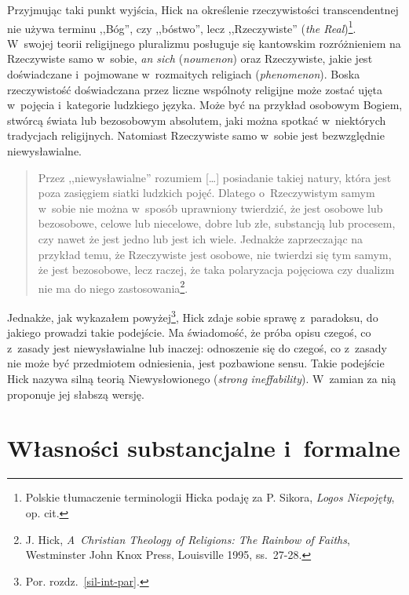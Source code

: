 Przyjmując taki punkt wyjścia, Hick na określenie rzeczywistości transcendentnej nie używa terminu ,,Bóg'', czy ,,bóstwo'', lecz ,,Rzeczywiste'' (\textit{the Real})\footnote{Polskie tłumaczenie terminologii Hicka podaję za P. Sikora, \textit{Logos Niepojęty}, op. cit.}. W~swojej teorii religijnego pluralizmu posługuje się kantowskim rozróżnieniem na Rzeczywiste samo w~sobie, \textit{an sich} (\textit{noumenon}) oraz Rzeczywiste, jakie jest doświadczane i~pojmowane w~rozmaitych religiach (\textit{phenomenon}). Boska rzeczywistość doświadczana przez liczne wspólnoty religijne może zostać ujęta w~pojęcia i~kategorie ludzkiego języka. Może być na przykład osobowym Bogiem, stwórcą świata lub bezosobowym absolutem, jaki można spotkać w~niektórych tradycjach religijnych. Natomiast Rzeczywiste samo w~sobie jest bezwzględnie niewysławialne.

\begin{quote}
Przez ,,niewysławialne'' rozumiem [\ldots] posiadanie takiej natury, która jest poza zasięgiem siatki ludzkich pojęć. Dlatego o~Rzeczywistym samym w~sobie nie można w~sposób uprawniony twierdzić, że jest osobowe lub bezosobowe, celowe lub niecelowe, dobre lub złe, substancją lub procesem, czy nawet że jest jedno lub jest ich wiele. Jednakże zaprzeczając na przykład temu, że Rzeczywiste jest osobowe, nie twierdzi się tym samym, że jest bezosobowe, lecz raczej, że taka polaryzacja pojęciowa czy dualizm nie ma do niego zastosowania\footnote{J. Hick, \textit{A~Christian Theology of Religions: The Rainbow of Faiths}, Westminster John Knox Press, Louisville 1995, ss.~27-28.}.
\end{quote}

Jednakże, jak wykazałem powyżej\footnote{Por. rozdz.~\ref{sil-int-par}.}, Hick zdaje sobie sprawę z~paradoksu, do jakiego prowadzi takie podejście. Ma świadomość, że próba opisu czegoś, co z~zasady jest niewysławialne lub inaczej: odnoszenie się do czegoś, co z~zasady nie może być przedmiotem odniesienia, jest pozbawione sensu. Takie podejście Hick nazywa silną teorią Niewysłowionego (\textit{strong ineffability}). W~zamian za nią proponuje jej słabszą wersję.


\section{Własności substancjalne i~formalne}


